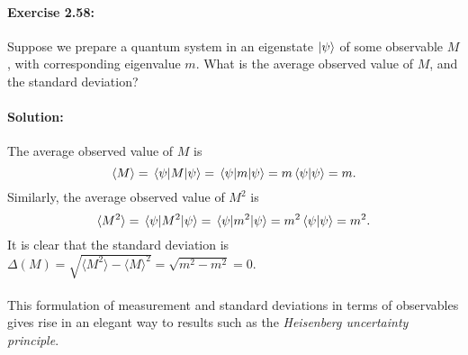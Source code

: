 \paragraph{\cite{mikeandike} Exercise 2.58:} Suppose we prepare a quantum
system in an eigenstate $\ket{\psi}$ of some observable $M$, with corresponding
eigenvalue $m$. What is the average observed value of $M$, and the standard
deviation?

\paragraph{Solution:} The average observed value of $M$ is \begin{equation*}
  \langle M \rangle = \mel{\psi}{M}{\psi} = \mel{\psi}{m}{\psi} =
  m\braket{\psi}{\psi} = m.
\end{equation*} Similarly, the average observed value of $M^2$ is
\begin{equation*}
  \langle M^2 \rangle = \mel{\psi}{M^2}{\psi} = \mel{\psi}{m^2}{\psi} =
  m^2\braket{\psi}{\psi} = m^2.
\end{equation*} It is clear that the standard deviation is $\Delta(M) = \sqrt{
  \langle M^2 \rangle - \langle M \rangle^2} = \sqrt{m^2 - m^2} = 0$.

\paragraph{} This formulation of measurement and standard deviations in terms
of observables gives rise in an elegant way to results such as the
\emph{Heisenberg uncertainty principle}.


